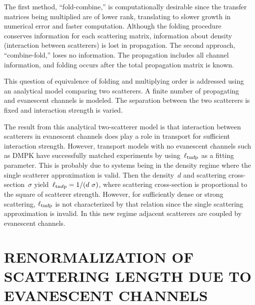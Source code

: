 The first method, ``fold-combine,'' is computationally desirable since the transfer matrices being multiplied are of lower rank, translating to slower growth in numerical error and faster computation. Although the folding procedure conserves information for each scattering matrix, information about density (interaction between scatterers) is lost in propagation. The second approach, ``combine-fold,'' loses no information. The propagation includes all channel information, and folding occurs after the total propagation matrix is known.


This question of equivalence of folding and multiplying order is addressed using an analytical model comparing two scatterers. A finite number of propagating and evanescent channels is modeled. The separation between the two scatterers is fixed and interaction strength is varied.

The result from this analytical two-scatterer model is that interaction between scatterers in evanescent channels does play a role in transport for sufficient interaction strength. However, transport models with no evanescent channels such as DMPK have successfully matched experiments by using~$\ell_{\rm tmfp}$ as a fitting parameter. This is probably due to systems being in the density regime where the single scatterer approximation is valid. Then the density~$d$ and scattering cross-section~$\sigma$ yield~$\ell_{\rm tmfp}=1/(d\ \sigma)$, where scattering cross-section is proportional to the square of scatterer strength. However, for sufficiently dense or strong scattering, $\ell_{\rm tmfp}$ is not characterized by that relation since the single scattering approximation is invalid. In this new regime adjacent scatterers are coupled by evanescent channels.

\section{RENORMALIZATION OF SCATTERING LENGTH DUE TO \\EVANESCENT CHANNELS}
\label{sec:scatlength}

